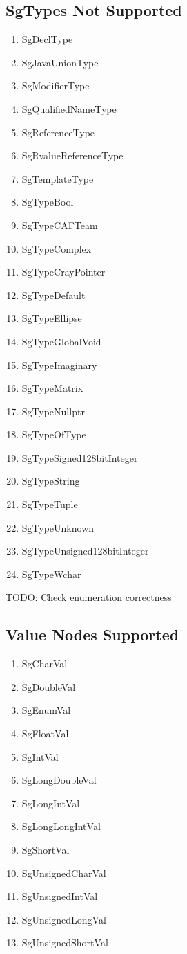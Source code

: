 \documentclass[11pt]{article}
\begin{document}
{\begin{enumeration}
\subsection{SgTypes Not Supported}
\begin{enumerate}
\item SgDeclType
\item SgJavaUnionType
\item SgModifierType
\item SgQualifiedNameType
\item SgReferenceType
\item SgRvalueReferenceType
\item SgTemplateType
\item SgTypeBool
\item SgTypeCAFTeam
\item SgTypeComplex
\item SgTypeCrayPointer
\item SgTypeDefault
\item SgTypeEllipse
\item SgTypeGlobalVoid
\item SgTypeImaginary
\item SgTypeMatrix
\item SgTypeNullptr
\item SgTypeOfType
\item SgTypeSigned128bitInteger
\item SgTypeString
\item SgTypeTuple
\item SgTypeUnknown
\item SgTypeUnsigned128bitInteger
\item SgTypeWchar
\end{enumerate}
TODO: Check enumeration correctness
\subsection{Value Nodes Supported}
\begin{enumerate}
\item SgCharVal
\item SgDoubleVal
\item SgEnumVal
\item SgFloatVal
\item SgIntVal
\item SgLongDoubleVal
\item SgLongIntVal
\item SgLongLongIntVal
\item SgShortVal  
\item SgUnsignedCharVal
\item SgUnsignedIntVal
\item SgUnsignedLongVal
\item SgUnsignedShortVal
\end{enumerate}

\end{enumeration}}
\end{document}
